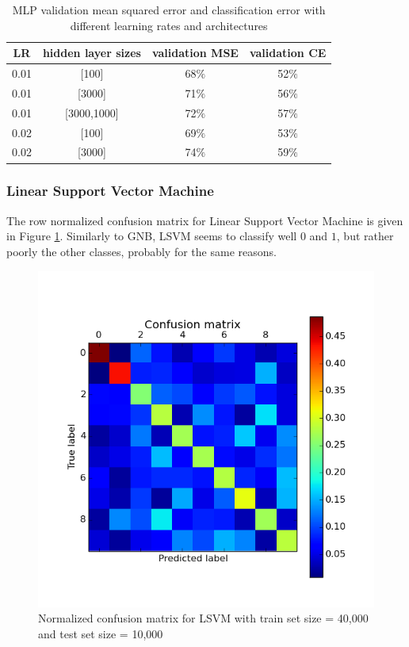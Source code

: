 \documentclass{acm_proc_article-sp}
\begin{document}
\begin{table}[!htbp]
\centering
  \begin{tabular}{| c | c  | c | c|}
    \hline
LR & hidden layer sizes & validation MSE & validation CE\\ \hline

0.01 & [100] & 68$\%$ & 52$\%$ \\ \hline
0.01 & [3000] & 71$\%$ & 56$\%$  \\ \hline
0.01 & [3000,1000] & 72$\%$ & 57$\%$ \\ \hline
0.02 & [100] &  69$\%$ & 53$\%$ \\ \hline
0.02 & [3000] & 74$\%$ & 59$\%$  \\ 
    \hline
  \end{tabular}
  \vspace*{2mm}
  \caption{MLP validation mean squared error and classification error with different learning rates and architectures}\label{table:1}
\end{table}

\subsubsection{Linear Support Vector Machine }
The row normalized confusion matrix for Linear Support Vector Machine is given in Figure \ref{fig:lsvm_conf}. Similarly to GNB, LSVM seems to classify well $0$ and $1$, but rather poorly the other classes, probably for the same reasons.
 
\begin{figure} 
\centering
\includegraphics[width=0.8\columnwidth]{graphs/svm_conf.png}  
\caption{ Normalized confusion matrix for LSVM with train set size = 40,000 and test set size = 10,000}
\label{fig:lsvm_conf}
\end{figure}
\end{document}
